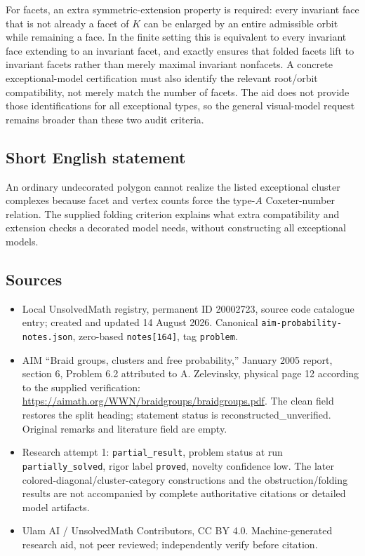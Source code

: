 \documentclass[11pt]{article}
\begin{document}
For facets, an extra symmetric-extension property is required: every invariant face that is not already a facet of $K$ can be enlarged by an entire admissible orbit while remaining a face. In the finite setting this is equivalent to every invariant face extending to an invariant facet, and exactly ensures that folded facets lift to invariant facets rather than merely maximal invariant nonfacets. A concrete exceptional-model certification must also identify the relevant root/orbit compatibility, not merely match the number of facets. The aid does not provide those identifications for all exceptional types, so the general visual-model request remains broader than these two audit criteria.
\subsection{Short English statement}
An ordinary undecorated polygon cannot realize the listed exceptional cluster complexes because facet and vertex counts force the type-$A$ Coxeter-number relation. The supplied folding criterion explains what extra compatibility and extension checks a decorated model needs, without constructing all exceptional models.
\subsection{Sources}
\begin{itemize}
\item Local UnsolvedMath registry, permanent ID 20002723, source code catalogue entry; created and updated 14 August 2026. Canonical \texttt{aim-probability-notes.json}, zero-based \texttt{notes[164]}, tag \texttt{problem}.
\item AIM ``Braid groups, clusters and free probability,'' January 2005 report, section 6, Problem 6.2 attributed to A. Zelevinsky, physical page 12 according to the supplied verification: \url{https://aimath.org/WWN/braidgroups/braidgroups.pdf}. The clean field restores the split heading; statement status is reconstructed\_unverified. Original remarks and literature field are empty.
\item Research attempt 1: \texttt{partial\_result}, problem status at run \texttt{partially\_solved}, rigor label \texttt{proved}, novelty confidence low. The later colored-diagonal/cluster-category constructions and the obstruction/folding results are not accompanied by complete authoritative citations or detailed model artifacts.
\item Ulam AI / UnsolvedMath Contributors, CC BY 4.0. Machine-generated research aid, not peer reviewed; independently verify before citation.
\end{itemize}
\end{document}
